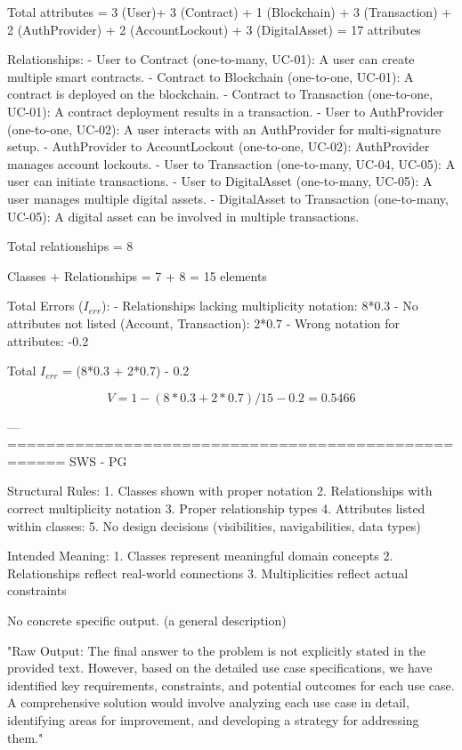 Total attributes = 3 (User)+ 3 (Contract) + 1 (Blockchain) + 3 (Transaction) + 2 (AuthProvider) + 2 (AccountLockout) + 3 (DigitalAsset) = 17 attributes

Relationships:
- User to Contract (one-to-many, UC-01): A user can create multiple smart contracts.
- Contract to Blockchain (one-to-one, UC-01): A contract is deployed on the blockchain.
- Contract to Transaction (one-to-one, UC-01): A contract deployment results in a transaction.
- User to AuthProvider (one-to-one, UC-02): A user interacts with an AuthProvider for multi-signature setup.
- AuthProvider to AccountLockout (one-to-one, UC-02): AuthProvider manages account lockouts.
- User to Transaction (one-to-many, UC-04, UC-05): A user can initiate transactions.
- User to DigitalAsset (one-to-many, UC-05): A user manages multiple digital assets.
- DigitalAsset to Transaction (one-to-many, UC-05): A digital asset can be involved in multiple transactions.

Total relationships = 8

Classes + Relationships = 7  + 8 = 15 elements

Total Errors (\( I_{err} \)):
- Relationships lacking multiplicity notation: 8*0.3
- No attributes not listed (Account, Transaction): 2*0.7
- Wrong notation for attributes: -0.2

Total \( I_{err} \) = (8*0.3 + 2*0.7) - 0.2

\[
V = 1 - (8*0.3 + 2*0.7)/15 - 0.2 = 0.5466
\]

---
====================================================
SWS - PG

Structural Rules:
1. Classes shown with proper notation
2. Relationships with correct multiplicity notation
3. Proper relationship types
4. Attributes listed within classes: 
5. No design decisions (visibilities, navigabilities, data types)

Intended Meaning:
1. Classes represent meaningful domain concepts
2. Relationships reflect real-world connections
3. Multiplicities reflect actual constraints

No concrete specific output. (a general description)

"Raw Output: The final answer to the problem is not explicitly stated in the provided text. However, based on the detailed use case specifications, we have identified key requirements, constraints, and potential outcomes for each use case. A comprehensive solution would involve analyzing each use case in detail, identifying areas for improvement, and developing a strategy for addressing them."

